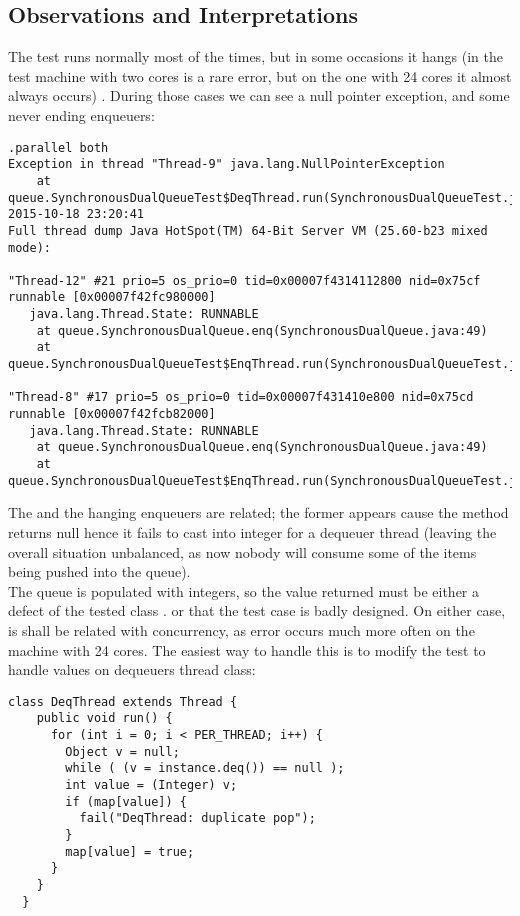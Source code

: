 \newpage
\subsection{Observations and Interpretations}
The test runs normally most of the times, but in some occasions it
hangs (in the test machine with two cores is a rare error, but on the
one with 24 cores it almost always occurs) . During those cases we can
see a null pointer exception, and some never ending enqueuers:

\begin{verbatim}
.parallel both
Exception in thread "Thread-9" java.lang.NullPointerException
	at queue.SynchronousDualQueueTest$DeqThread.run(SynchronousDualQueueTest.java:67)
2015-10-18 23:20:41
Full thread dump Java HotSpot(TM) 64-Bit Server VM (25.60-b23 mixed mode):

"Thread-12" #21 prio=5 os_prio=0 tid=0x00007f4314112800 nid=0x75cf runnable [0x00007f42fc980000]
   java.lang.Thread.State: RUNNABLE
	at queue.SynchronousDualQueue.enq(SynchronousDualQueue.java:49)
	at queue.SynchronousDualQueueTest$EnqThread.run(SynchronousDualQueueTest.java:60)

"Thread-8" #17 prio=5 os_prio=0 tid=0x00007f431410e800 nid=0x75cd runnable [0x00007f42fcb82000]
   java.lang.Thread.State: RUNNABLE
	at queue.SynchronousDualQueue.enq(SynchronousDualQueue.java:49)
	at queue.SynchronousDualQueueTest$EnqThread.run(SynchronousDualQueueTest.java:60)
\end{verbatim}
\hfill

The  and the hanging enqueuers are related;
the former appears cause the  method returns null hence it
fails to cast into integer for a dequeuer thread (leaving the overall
situation unbalanced, as now nobody will consume some of the items
being pushed into the queue). \\

The queue is populated with integers, so the  value returned
must be either a defect of the tested class . 
or that the test case is badly designed.
On either case, is shall be
related with concurrency, as error occurs much more often on the machine
with 24 cores. The easiest way to handle this is to modify the test to
handle  values on dequeuers thread class: \\

\newpage
\begin{lstlisting}[style=nonumbers]
  class DeqThread extends Thread {
    public void run() {
      for (int i = 0; i < PER_THREAD; i++) {
        Object v = null;
        while ( (v = instance.deq()) == null ); 
        int value = (Integer) v;
        if (map[value]) {
          fail("DeqThread: duplicate pop");
        }
        map[value] = true;
      }
    }
  }  
\end{lstlisting}
\hfill

